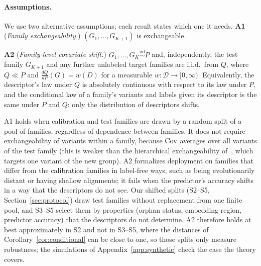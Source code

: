 \paragraph{Assumptions.} We use two alternative assumptions; each result states which one it needs.
\noindent\textbf{A1} (\emph{Family exchangeability.}) $(G_1,\dots,G_{K+1})$ is exchangeable.


\noindent\textbf{A2} (\emph{Family-level covariate shift.}) $G_1,\dots,G_K\stackrel{\text{iid}}{\sim}P$ and, independently, the test family $G_{K+1}$ and any further unlabeled target families are i.i.d.\ from $Q$, where $Q\ll P$ and $\frac{dQ}{dP}(G)=w(D)$ for a measurable $w:\mathcal{D}\to[0,\infty)$. Equivalently, the descriptor's law under $Q$ is absolutely continuous with respect to its law under $P$, and the conditional law of a family's variants and labels given its descriptor is the same under $P$ and $Q$: only the distribution of descriptors shifts.

A1 holds when calibration and test families are drawn by a random split of a pool of families, regardless of dependence between families. It does not require exchangeability of variants within a family, because $\mathrm{Cov}$ averages over all variants of the test family (this is weaker than the hierarchical exchangeability of~\cite{lee2026hierarchical}, which targets one variant of the new group). A2 formalizes deployment on families that differ from the calibration families in label-free ways, such as being evolutionarily distant or having shallow alignments; it fails when the predictor's accuracy shifts in a way that the descriptors do not see. Our shifted splits (S2--S5, Section~\ref{sec:protocol}) draw test families without replacement from one finite pool, and S3--S5 select them by properties (orphan status, embedding region, predictor accuracy) that the descriptors do not determine. A2 therefore holds at best approximately in S2 and not in S3--S5, where the distances of Corollary~\ref{cor:conditional} can be close to one, so those splits only measure robustness; the simulations of Appendix~\ref{app:synthetic} check the case the theory covers.
